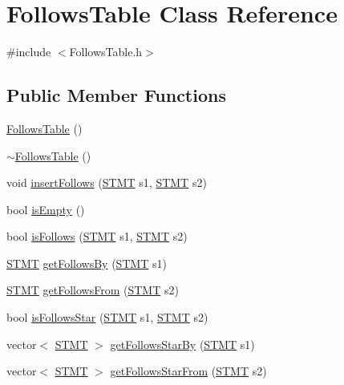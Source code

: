 \hypertarget{class_follows_table}{\section{Follows\-Table Class Reference}
\label{class_follows_table}
}


{\ttfamily \#include $<$Follows\-Table.\-h$>$}

\subsection*{Public Member Functions}
\begin{DoxyCompactItemize}
\item 
\hyperlink{class_follows_table_a3f8037760cee7e5dc50a2df832f6c4ad}{Follows\-Table} ()
\item 
\hyperlink{class_follows_table_a8cab8d2775cf2586e54e16fddc733ca2}{$\sim$\-Follows\-Table} ()
\item 
void \hyperlink{class_follows_table_a7bea1745b1f8b37e9ed96f5159116b8b}{insert\-Follows} (\hyperlink{std_afx_8h_a4a876b28ac3f59cecb39c2d2d76e4e7a}{S\-T\-M\-T} s1, \hyperlink{std_afx_8h_a4a876b28ac3f59cecb39c2d2d76e4e7a}{S\-T\-M\-T} s2)
\item 
bool \hyperlink{class_follows_table_a0eaf7b1c70730a6f658be07d1c6d60c4}{is\-Empty} ()
\item 
bool \hyperlink{class_follows_table_abe6692baa87cd5982996dd33400db8c1}{is\-Follows} (\hyperlink{std_afx_8h_a4a876b28ac3f59cecb39c2d2d76e4e7a}{S\-T\-M\-T} s1, \hyperlink{std_afx_8h_a4a876b28ac3f59cecb39c2d2d76e4e7a}{S\-T\-M\-T} s2)
\item 
\hyperlink{std_afx_8h_a4a876b28ac3f59cecb39c2d2d76e4e7a}{S\-T\-M\-T} \hyperlink{class_follows_table_aac4f2858b050a35ae0b351d5d2baee7b}{get\-Follows\-By} (\hyperlink{std_afx_8h_a4a876b28ac3f59cecb39c2d2d76e4e7a}{S\-T\-M\-T} s1)
\item 
\hyperlink{std_afx_8h_a4a876b28ac3f59cecb39c2d2d76e4e7a}{S\-T\-M\-T} \hyperlink{class_follows_table_a66ba94980e93271d5a99efe43915db76}{get\-Follows\-From} (\hyperlink{std_afx_8h_a4a876b28ac3f59cecb39c2d2d76e4e7a}{S\-T\-M\-T} s2)
\item 
bool \hyperlink{class_follows_table_ad68f64135cb00d8a29919bd924519fc6}{is\-Follows\-Star} (\hyperlink{std_afx_8h_a4a876b28ac3f59cecb39c2d2d76e4e7a}{S\-T\-M\-T} s1, \hyperlink{std_afx_8h_a4a876b28ac3f59cecb39c2d2d76e4e7a}{S\-T\-M\-T} s2)
\item 
vector$<$ \hyperlink{std_afx_8h_a4a876b28ac3f59cecb39c2d2d76e4e7a}{S\-T\-M\-T} $>$ \hyperlink{class_follows_table_a016f03c806ce676c62b51c623d549659}{get\-Follows\-Star\-By} (\hyperlink{std_afx_8h_a4a876b28ac3f59cecb39c2d2d76e4e7a}{S\-T\-M\-T} s1)
\item 
vector$<$ \hyperlink{std_afx_8h_a4a876b28ac3f59cecb39c2d2d76e4e7a}{S\-T\-M\-T} $>$ \hyperlink{class_follows_table_ab77cdda2c13684c54934884161a673c3}{get\-Follows\-Star\-From} (\hyperlink{std_afx_8h_a4a876b28ac3f59cecb39c2d2d76e4e7a}{S\-T\-M\-T} s2)
\end{DoxyCompactItemize}


